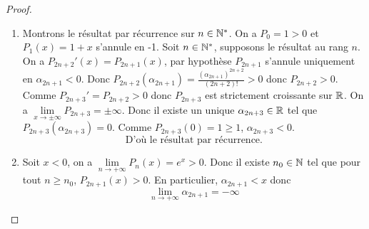 \begin{proof}
	\phantom{}
	\begin{enumerate}
		\item Montrons le résultat par récurrence sur $n\in\mathbb{N}^{*}$. On a $P_{0}=1>0$ et $P_{1}(x)=1+x$ s'annule en -1. Soit $n\in\mathbb{N}^{*}$, supposons le résultat au rang $n$. On a $P_{2n+2}'(x)=P_{2n+1}(x)$, par hypothèse $P_{2n+1}$ s'annule uniquement en $\alpha_{2n+1}<0$. Donc $P_{2n+2}	(\alpha_{2n+1})=\frac{\left(\alpha_{2n+1}\right)^{2n+2}}{(2n+2)!}>0$ donc $P_{2n+2}>0$.
		Comme $P_{2n+3}'=P_{2n+2}>0$ donc $P_{2n+3}$ est strictement croissante sur $\mathbb{R}$. On a $\lim\limits_{x\to\pm\infty}P_{2n+3}=\pm\infty$. Donc il existe un unique $\alpha_{2n+3}\in\mathbb{R}$ tel que $P_{2n+3}(\alpha_{2n+3})=0$. Comme $P_{2n+3}(0)=1\geqslant1$, $\alpha_{2n+3}<0$.
		\begin{equation}\boxed{\text{D'où le résultat par récurrence.}}\end{equation}

		\item Soit $x<0$, on a $\lim\limits_{n\to+\infty}P_{n}(x)=e^{x}>0$. Donc il existe $n_{0}\in\mathbb{N}$ tel que pour tout $n\geqslant n_{0}$, $P_{2n+1}(x)>0$. En particulier, $\alpha_{2n+1}<x$ donc 
		\begin{equation}\boxed{\lim\limits_{n\to+\infty}\alpha_{2n+1}=-\infty}\end{equation}
	\end{enumerate}
\end{proof}

